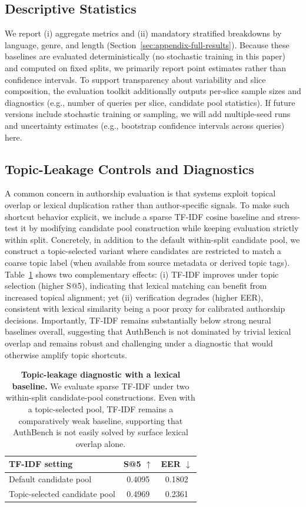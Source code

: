 \documentclass{article}
\begin{document}
\subsection{Descriptive Statistics}
\label{sec:checklist-c3}
We report (i) aggregate metrics and (ii) mandatory stratified breakdowns by language, genre, and length (Section~\ref{sec:appendix-full-results}).
Because these baselines are evaluated deterministically (no stochastic training in this paper) and computed on fixed splits, we primarily report point estimates rather than confidence intervals.
To support transparency about variability and slice composition, the evaluation toolkit additionally outputs per-slice sample sizes and diagnostics (e.g., number of queries per slice, candidate pool statistics).
If future versions include stochastic training or sampling, we will add multiple-seed runs and uncertainty estimates (e.g., bootstrap confidence intervals across queries) here.

\subsection{Topic-Leakage Controls and Diagnostics}
\label{subsec:topic-leakage}
A common concern in authorship evaluation is that systems exploit topical overlap or lexical duplication rather than author-specific signals.
To make such shortcut behavior explicit, we include a sparse TF-IDF cosine baseline and stress-test it by modifying candidate pool construction while keeping evaluation strictly within split.
Concretely, in addition to the default within-split candidate pool, we construct a topic-selected variant where candidates are restricted to match a coarse topic label (when available from source metadata or derived topic tags).
Table~\ref{tab:topic-leakage-tfidf} shows two complementary effects: (i) TF-IDF improves under topic selection (higher S@5), indicating that lexical matching can benefit from increased topical alignment; yet (ii) verification degrades (higher EER), consistent with lexical similarity being a poor proxy for calibrated authorship decisions.
Importantly, TF-IDF remains substantially below strong neural baselines overall, suggesting that AuthBench is not dominated by trivial lexical overlap and remains robust and challenging under a diagnostic that would otherwise amplify topic shortcuts.
\begin{table}[h!]
\centering
\small
\setlength{\tabcolsep}{8pt}
\begin{tabular}{lcc}
\toprule
\textbf{TF-IDF setting} & \textbf{S@5 $\uparrow$} & \textbf{EER $\downarrow$} \\
\midrule
Default candidate pool & 0.4095 & 0.1802 \\
Topic-selected candidate pool & 0.4969 & 0.2361 \\
\bottomrule
\end{tabular}
\caption{\textbf{Topic-leakage diagnostic with a lexical baseline.}
We evaluate sparse TF-IDF under two within-split candidate-pool constructions. Even with a topic-selected pool, TF-IDF remains a comparatively weak baseline, supporting that AuthBench is not easily solved by surface lexical overlap alone.}
\label{tab:topic-leakage-tfidf}
\end{table}
\end{document}
